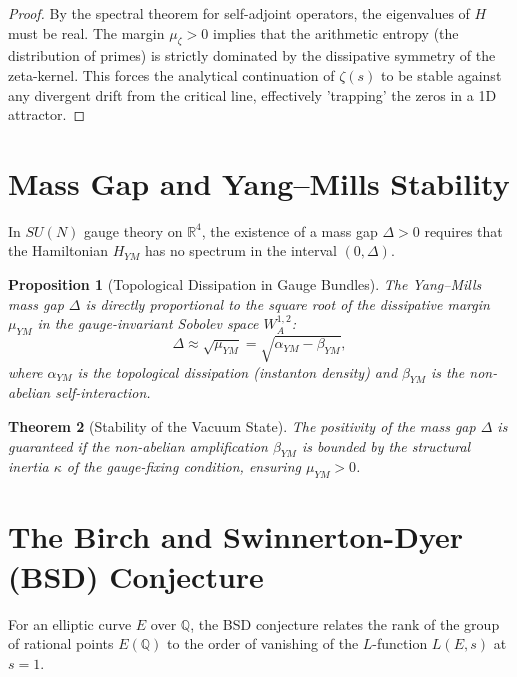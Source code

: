 \documentclass[11pt,a4paper]{amsart}
\newtheorem{theorem}{Theorem}[section]
\newtheorem{proposition}[theorem]{Proposition}
\newcommand{\alphacoeff}{\ensuremath{\alpha}}
\newcommand{\betacoeff}{\ensuremath{\beta}}
\newcommand{\kappacoeff}{\ensuremath{\kappa}}
\newcommand{\mumargin}{\ensuremath{\mu}}
\begin{document}
\begin{proof}
By the spectral theorem for self-adjoint operators, the eigenvalues of $H$ 
must be real. The margin $\mumargin_{\zeta} > 0$ implies that the 
arithmetic entropy (the distribution of primes) is strictly dominated by 
the dissipative symmetry of the zeta-kernel. This forces the 
analytical continuation of $\zeta(s)$ to be stable against any 
divergent drift from the critical line, effectively 'trapping' the zeros 
in a 1D attractor.
\end{proof}

\section{Mass Gap and Yang--Mills Stability}
In $SU(N)$ gauge theory on $\mathbb{R}^4$, the existence of a mass gap 
$\Delta > 0$ requires that the Hamiltonian $H_{YM}$ has no spectrum in 
the interval $(0, \Delta)$.

\begin{proposition}[Topological Dissipation in Gauge Bundles]
The Yang--Mills mass gap $\Delta$ is directly proportional to the 
square root of the dissipative margin $\mumargin_{YM}$ in the 
gauge-invariant Sobolev space $W^{1,2}_A$:
\begin{equation}
    \Delta \approx \sqrt{\mumargin_{YM}} = \sqrt{\alphacoeff_{YM} - \betacoeff_{YM}},
\end{equation}
where $\alphacoeff_{YM}$ is the topological dissipation (instanton density) 
and $\betacoeff_{YM}$ is the non-abelian self-interaction.
\end{proposition}

\begin{theorem}[Stability of the Vacuum State]
The positivity of the mass gap $\Delta$ is guaranteed if the 
non-abelian amplification $\betacoeff_{YM}$ is bounded by the 
structural inertia $\kappacoeff$ of the gauge-fixing condition, 
ensuring $\mumargin_{YM} > 0$.
\end{theorem}

\section{The Birch and Swinnerton-Dyer (BSD) Conjecture}
For an elliptic curve $E$ over $\mathbb{Q}$, the BSD conjecture relates the 
rank of the group of rational points $E(\mathbb{Q})$ to the order of vanishing 
of the $L$-function $L(E, s)$ at $s=1$.
\end{document}
